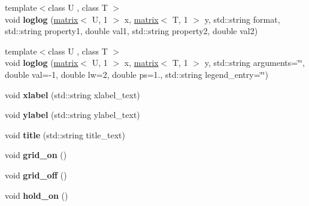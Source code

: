 \begin{DoxyCompactItemize}
\item 
\hypertarget{classkeycpp_1_1_figure_a3cb4cdb5bcc2228492dd7577bc774b34}{{\footnotesize template$<$class U , class T $>$ }\\void {\bfseries loglog} (\hyperlink{classkeycpp_1_1matrix}{matrix}$<$ U, 1 $>$ x, \hyperlink{classkeycpp_1_1matrix}{matrix}$<$ T, 1 $>$ y, std\-::string format, std\-::string property1, double val1, std\-::string property2, double val2)}\label{classkeycpp_1_1_figure_a3cb4cdb5bcc2228492dd7577bc774b34}

\item 
\hypertarget{classkeycpp_1_1_figure_a61dae76a8b73c0bf1af686692c3d57ae}{{\footnotesize template$<$class U , class T $>$ }\\void {\bfseries loglog} (\hyperlink{classkeycpp_1_1matrix}{matrix}$<$ U, 1 $>$ x, \hyperlink{classkeycpp_1_1matrix}{matrix}$<$ T, 1 $>$ y, std\-::string arguments=\char`\"{}\char`\"{}, double val=-\/1, double lw=2, double ps=1., std\-::string legend\-\_\-entry=\char`\"{}\char`\"{})}\label{classkeycpp_1_1_figure_a61dae76a8b73c0bf1af686692c3d57ae}

\item 
\hypertarget{classkeycpp_1_1_figure_addd610a718f021f3e6c7c94f9bc7f285}{void {\bfseries xlabel} (std\-::string xlabel\-\_\-text)}\label{classkeycpp_1_1_figure_addd610a718f021f3e6c7c94f9bc7f285}

\item 
\hypertarget{classkeycpp_1_1_figure_aa965967db2165b001860f75fc22c9f28}{void {\bfseries ylabel} (std\-::string ylabel\-\_\-text)}\label{classkeycpp_1_1_figure_aa965967db2165b001860f75fc22c9f28}

\item 
\hypertarget{classkeycpp_1_1_figure_a922bd966ed40095f0ae7fa184f9d0ada}{void {\bfseries title} (std\-::string title\-\_\-text)}\label{classkeycpp_1_1_figure_a922bd966ed40095f0ae7fa184f9d0ada}

\item 
\hypertarget{classkeycpp_1_1_figure_a3c036559f8ad56b099ac0b44c652225d}{void {\bfseries grid\-\_\-on} ()}\label{classkeycpp_1_1_figure_a3c036559f8ad56b099ac0b44c652225d}

\item 
\hypertarget{classkeycpp_1_1_figure_a3736e01bc278c2c2b47e4ff046fdda0e}{void {\bfseries grid\-\_\-off} ()}\label{classkeycpp_1_1_figure_a3736e01bc278c2c2b47e4ff046fdda0e}

\item 
\hypertarget{classkeycpp_1_1_figure_a65b80e5b67c7bbf225e3001a538a6dad}{void {\bfseries hold\-\_\-on} ()}\label{classkeycpp_1_1_figure_a65b80e5b67c7bbf225e3001a538a6dad}


\end{DoxyCompactItemize}

